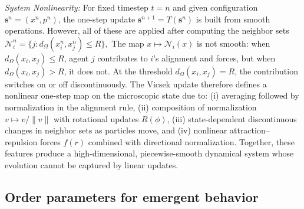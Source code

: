 \documentclass{report}
\theoremstyle{plain}
\theoremstyle{remark}
\numberwithin{equation}{section}              %
\begin{document}
\noindent \emph{System Nonlinearity:} For fixed timestep $t=n$ and given configuration $\mathbf{s}^n = (x^n,p^n)$, the one-step update $\mathbf{s}^{n+1} = T(\mathbf{s}^n)$ is built from smooth operations. However, all of these are applied after computing the neighbor sets $\mathcal{N}_i^n = \{ j : d_\Omega(x_i^n,x_j^n) \le R \},$ The map $x \mapsto \mathcal{N}_i(x)$ is not smooth: when $d_\Omega(x_i,x_j) \le R$, agent $j$ contributes to $i$'s alignment and forces, but when $d_\Omega(x_i,x_j) > R$, it does not. At the threshold $d_\Omega(x_i,x_j) = R$, the contribution switches on or off discontinuously.
The Vicsek update therefore defines a nonlinear one-step map on the microscopic state due to: (i) averaging followed by normalization in the alignment rule, (ii) composition of normalization $v \mapsto v/\|v\|$ with rotational updates $R(\phi)$, (iii) state-dependent discontinuous changes in neighbor sets as particles move, and (iv) nonlinear attraction--repulsion forces $f(r)$ combined with directional normalization. Together, these features produce a high-dimensional, piecewise-smooth dynamical system whose evolution cannot be captured by linear updates.

\subsection{Order parameters for emergent behavior}
\label{sec:order_parameters}
\end{document}
